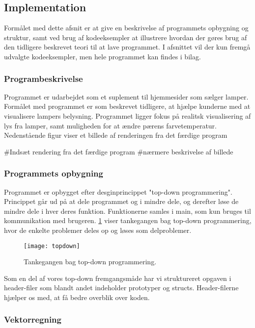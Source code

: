 \subsection{Implementation}

Formålet med dette afsnit er at give en beskrivelse af programmets opbygning og struktur, samt ved brug af kodeeksempler at illustrere hvordan der gøres brug af den tidligere beskrevet teori til at lave programmet. I afsnittet vil der kun fremgå udvalgte kodeeksempler, men hele programmet kan findes i bilag. 

\subsubsection{Programbeskrivelse}

Programmet er udarbejdet som et suplement til hjemmesider som sælger lamper. Formålet med programmet er som beskrevet tidligere, at hjælpe kunderne med at visualisere lampers belysning. Programmet ligger fokus på realitsk visualisering af lys fra lamper, samt muligheden for at ændre pærens farvetemperatur.
Nedenstående figur viser et billede af renderingen fra det færdige program

\#Indsæt rendering fra det færdige program
\#nærmere beskrivelse af billede

\subsubsection{Programmets opbygning}

Programmet er opbygget efter desginprincippet "top-down programmering". Princippet går ud på at dele programmet og i mindre dele, og derefter løse de mindre dele i hver deres funktion. Funktionerne samles i main, som kun bruges til kommunikation med brugeren. 
\ref{fig:topdown} viser tankegangen bag top-down programmering, hvor de enkelte problemer deles op og løses som delproblemer. 

\begin{figure}[H]
    \centering
    \texttt{[image: topdown]}
    \caption{Tankegangen bag top-down programmering.}
    \label{fig:topdown}
\end{figure}

Som en del af vores top-down fremgangsmåde har vi struktureret opgaven i header-filer som blandt andet indeholder prototyper og structs. Header-filerne hjælper os med, at få bedre overblik over koden. 

\subsubsection{Vektorregning}

